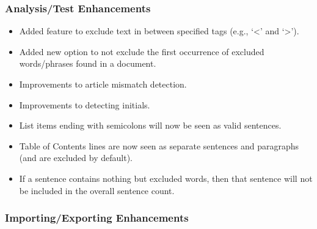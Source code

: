 \documentclass[
]{book}
\providecommand{\tightlist}{%
  \setlength{\itemsep}{0pt}\setlength{\parskip}{0pt}}
\theoremstyle{definition}
\theoremstyle{definition}
\theoremstyle{definition}
\theoremstyle{definition}
\theoremstyle{remark}
\begin{document}
\hypertarget{analysistest-enhancements-2}{%
\subsubsection*{Analysis/Test Enhancements}\label{analysistest-enhancements-2}}

\begin{itemize}
\tightlist
\item
  Added feature to exclude text in between specified tags (e.g., `\textless{}' and `\textgreater{}').
\item
  Added new option to not exclude the first occurrence of excluded words/phrases found in a document.
\item
  Improvements to article mismatch detection.
\item
  Improvements to detecting initials.
\item
  List items ending with semicolons will now be seen as valid sentences.
\item
  Table of Contents lines are now seen as separate sentences and paragraphs (and are excluded by default).
\item
  If a sentence contains nothing but excluded words, then that sentence will not be included in the overall sentence count.
\end{itemize}

\hypertarget{importingexporting-enhancements-2}{%
\subsubsection*{Importing/Exporting Enhancements}\label{importingexporting-enhancements-2}}
\end{document}
